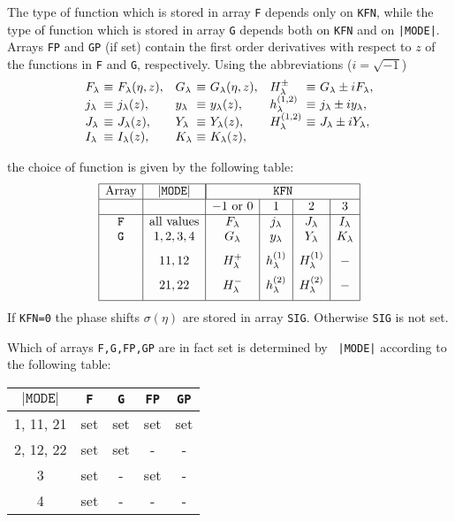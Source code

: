 \par
The type of function which is stored in array {\tt F} depends only on
{\tt KFN}, while the type of function which is stored in array {\tt G}
depends both on {\tt KFN} and on {\tt |MODE|}. Arrays {\tt FP} and
{\tt GP} (if set) contain the first order derivatives with respect to $z$
of the functions in {\tt F} and {\tt G}, respectively.
Using the abbreviations ($i = \sqrt{-1}$)
$$\begin{array}{l@{\ \equiv \ }ll@{\ \equiv \ }ll@{\ \equiv \ }l}
F_\lambda & F_\lambda(\eta,z), & G_\lambda & G_\lambda(\eta,z), &
H^\pm_\lambda & G_\lambda \pm iF_\lambda, \\
j_\lambda &  j_\lambda(z), & y_\lambda &  y_\lambda(z),  &
h_\lambda^{(1,2)} &  j_\lambda \pm iy_\lambda, \\
J_\lambda &  J_\lambda(z), & Y_\lambda &  Y_\lambda(z),  &
H_\lambda^{(1,2)} & J_\lambda \pm iY_\lambda,  \\
I_\lambda &  I_\lambda(z), & K_\lambda & K_\lambda(z),
\end{array}$$
\par
the choice of function is given by the following table:
$$\begin{array}{|c|c|c|c|c|c|}
\hline
\mbox{\rm Array} & \mathtt{|MODE|} &
\multicolumn{4}{|c|} {\mathtt{KFN}}\\
\hline
& & -1 \ \mbox{\rm or } 0 & 1 & 2 & 3 \\
\hline
\mathtt{F} & \mbox{\rm all values} & F_{\lambda} & j_{\lambda}
& J_{\lambda} & I_{\lambda}           \\
\mathtt{G} & 1,2,3,4  & G_{\lambda}  & y_{\lambda}
& Y_{\lambda}  & K_{\lambda}      \\ [2mm]
& 11,12 & H^+_{\lambda}& h^{(1)}_{\lambda}
& H ^{(1)}_{\lambda}    &-        \\ [2mm]
& 21,22    & H^-_{\lambda} &h^{(2)}_{\lambda}
& H^{(2)}_{\lambda}&- \\ [2mm]
\hline
\end{array}$$
If {\tt KFN=0} the phase shifts $\sigma(\eta)$ are stored in array
{\tt SIG}. Otherwise {\tt SIG} is not set.
\par
Which of arrays {\tt F,G,FP,GP} are in fact set is determined by {\tt
|MODE|}
according to the following table:
\begin{center}
\begin{tabular}{|c|c|c|c|c|}
\hline
$\mathtt{|MODE|}$ & {\tt F} & {\tt G} & {\tt FP}  & {\tt GP} \\
\hline
1, 11, 21   & set     & set      & set   & set \\
2, 12, 22   & set     & set      & -     & -   \\
3           & set     & -        & set   & -    \\
4           & set     & -        & -     &-    \\
\hline
\end{tabular}
\end{center}
